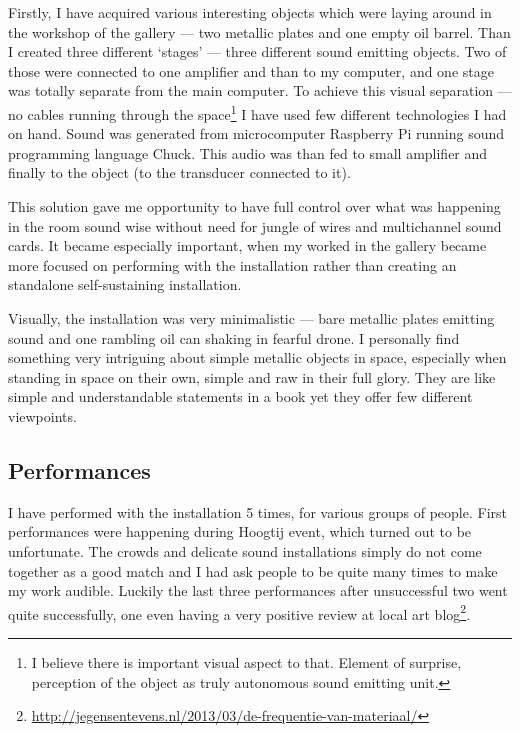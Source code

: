 \documentclass[12pt,a4paper,oneside]{report}
\begin{document}
Firstly, I have acquired various interesting objects which were laying around in the workshop of the gallery --- two metallic plates and one empty oil barrel. Than I created three different `stages' --- three different sound emitting objects. Two of those were connected to one amplifier and than to my computer, and one stage was totally separate from the main computer. To achieve this visual separation --- no cables running through the space\footnote{I believe there is important visual aspect to that. Element of surprise, perception of the object as truly autonomous sound emitting unit.} I have used few different technologies I had on hand. Sound was generated from microcomputer Raspberry Pi running sound programming language Chuck. This audio was than fed to small amplifier and finally to the object (to the transducer connected to it).

This solution gave me opportunity to have full control over what was happening in the room sound wise without need for jungle of wires and multichannel sound cards. It became especially important, when my worked in the gallery became more focused on performing with the installation rather than creating an standalone self-sustaining installation.

Visually, the installation was very minimalistic --- bare metallic plates emitting sound and one rambling oil can shaking in fearful drone. I personally find something very intriguing about simple metallic objects in space, especially when standing in space on their own, simple and raw in their full glory. They are like simple and understandable statements in a book yet they offer few different viewpoints.

\subsection{Performances}

I have performed with the installation 5 times, for various groups of people. First performances were happening during Hoogtij event, which turned out to be unfortunate. The crowds and delicate sound installations simply do not come together as a good match and I had ask people to be quite many times to make my work audible. Luckily the last three performances after unsuccessful two went quite successfully, one even having a very positive review at local art blog\footnote{\url{http://jegensentevens.nl/2013/03/de-frequentie-van-materiaal/}}.
\end{document}
